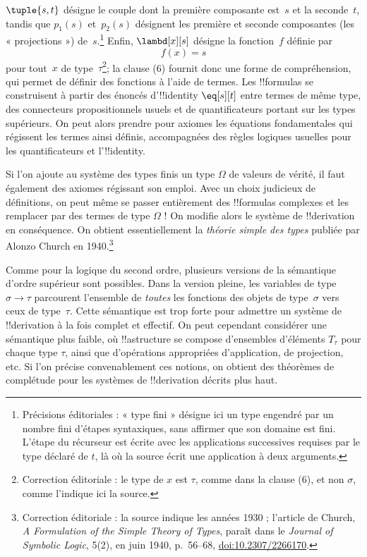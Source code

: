 \documentclass[../../../include/open-logic-section]{subfiles}
\begin{document}
$\tuple{s, t}$ désigne le couple dont la première composante
est~$s$ et la seconde~$t$, tandis que $p_1(s)$ et~$p_2(s)$ désignent
les première et seconde composantes (les « projections ») de~$s$.\footnote{Précisions éditoriales : « type fini » désigne ici un type engendré par un nombre fini d'étapes syntaxiques, sans affirmer que son domaine est fini. L'étape du récurseur est écrite avec les applications successives requises par le type déclaré de $t$, là où la source écrit une application à deux arguments.}
Enfin, $\lambd[x][s]$ désigne la fonction~$f$ définie par
\[
f(x) = s
\]
pour tout~$x$ de type~$\tau$\footnote{Correction éditoriale : le type de $x$ est $\tau$, comme dans la clause (6), et non $\sigma$, comme l'indique ici la source.}; la clause (6) fournit donc une forme
de compréhension, qui permet de définir des fonctions à l'aide de
termes. Les !!{formula}s se construisent à partir des énoncés
d'!!{identity} $\eq[s][t]$ entre termes de même type, des connecteurs
propositionnels usuels et de quantificateurs portant sur les types
supérieurs. On peut alors prendre pour axiomes les équations
fondamentales qui régissent les termes ainsi définis, accompagnées
des règles logiques usuelles pour les quantificateurs et
l'!!{identity}.

Si l'on ajoute au système des types finis un type $\Omega$ de
valeurs de vérité, il faut également des axiomes régissant son emploi.
Avec un choix judicieux de définitions, on peut même se passer
entièrement des !!{formula}s complexes et les remplacer par des termes
de type $\Omega$ !{} On modifie alors le système de !!{derivation}
en conséquence. On obtient essentiellement la \emph{théorie simple
des types} publiée par Alonzo Church en 1940.\footnote{Correction éditoriale : la source indique les années 1930 ; l'article de Church, \emph{A Formulation of the Simple Theory of Types}, paraît dans le \emph{Journal of Symbolic Logic}, 5(2), en juin 1940, p.~56--68, \href{https://doi.org/10.2307/2266170}{doi:10.2307/2266170}.}

Comme pour la logique du second ordre, plusieurs versions de la
sémantique d'ordre supérieur sont possibles. Dans la version pleine,
les variables de type $\sigma \to \tau$ parcourent l'ensemble de
\emph{toutes} les fonctions des objets de type~$\sigma$ vers ceux de
type~$\tau$. Cette sémantique est trop forte pour
admettre un système de !!{derivation} à la fois complet et effectif.
On peut cependant considérer une sémantique plus faible, où
!!a{structure} se compose d'ensembles d'éléments $T_\tau$ pour
chaque type $\tau$, ainsi que d'opérations appropriées
d'application, de projection, etc. Si l'on précise convenablement
ces notions, on obtient des théorèmes de complétude pour les
systèmes de !!{derivation} décrits plus haut.
\end{document}
